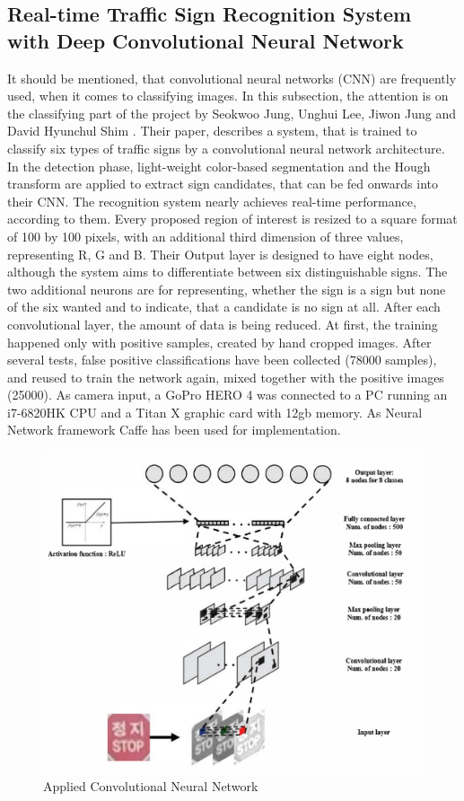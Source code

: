 \subsection{Real-time Traffic Sign Recognition System with Deep Convolutional Neural Network}
It should be mentioned, that convolutional neural networks (CNN) are frequently used, when it comes to classifying images.
In this subsection, the attention is on the classifying part of the project by Seokwoo Jung, Unghui Lee, Jiwon Jung and David Hyunchul Shim \cite{tsrcnn}. 
Their paper, describes a system, that is trained to classify six types of traffic signs by a convolutional
neural network architecture. In the detection phase, light-weight color-based segmentation and the Hough transform  are applied to extract sign candidates, that can be fed onwards into their CNN. The recognition system nearly achieves real-time performance, according to them. \newline
Every proposed region of interest is resized to a square format of 100 by 100 pixels, with an additional third dimension of three values, representing R, G and B. Their Output layer is designed to have eight nodes, although the system aims to differentiate between six distinguishable signs. The two additional neurons are for representing, whether the sign is a sign but none of the six wanted and to indicate, that a candidate is no sign at all. After each convolutional layer, the amount of data is being reduced.  
At first, the
training happened only with positive samples, created by hand cropped images. After several tests, false positive classifications have been collected (78000 samples), and reused to train the network again, mixed together with the positive images (25000). As camera input, a GoPro HERO 4 was connected to a PC running an i7-6820HK CPU and a Titan X graphic card with 12gb memory. As Neural Network framework Caffe has been used for implementation.

\begin{figure}[H]
	\centering
	\includegraphics[width = 0.75\linewidth]{images/koreancnn.png}
	\caption{Applied Convolutional Neural Network \cite{tsrcnn}}
	\label{fig:koreanNN }
\end{figure}

